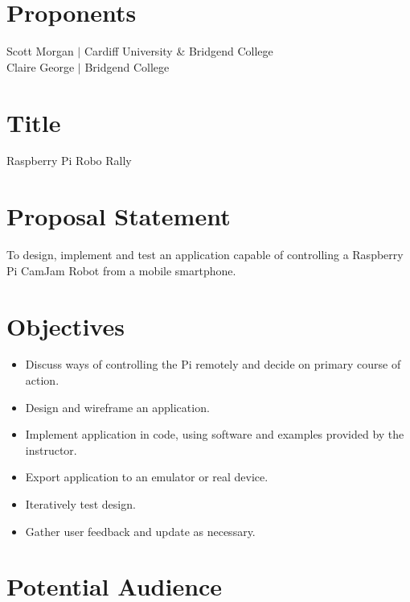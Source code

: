 \documentclass[10pt]{article}
\begin{document}
	
	\newpage																		
	
	\newpage
	
	\section{Proponents}
	
	Scott Morgan \hspace{3mm} $\vert$ \hspace{3mm} Cardiff University \& Bridgend College \\
	Claire George \hspace{3mm} $\vert$ \hspace{3mm} Bridgend College
	
	\section{Title} 
	
	Raspberry Pi Robo Rally 
	
	\section{Proposal Statement}
	
	To design, implement and test an application capable of controlling a Raspberry Pi CamJam Robot from a mobile smartphone.
	
	\section{Objectives}

	\begin{itemize}
		\item Discuss ways of controlling the Pi remotely and decide on primary course of action.  
		\item Design and wireframe an application.
		\item Implement application in code, using software and examples provided by the instructor.
		\item Export application to an emulator or real device.
		\item Iteratively test design.
		\item Gather user feedback and update as necessary.
	\end{itemize}
	
	\section{Potential Audience}
	
\end{document}
